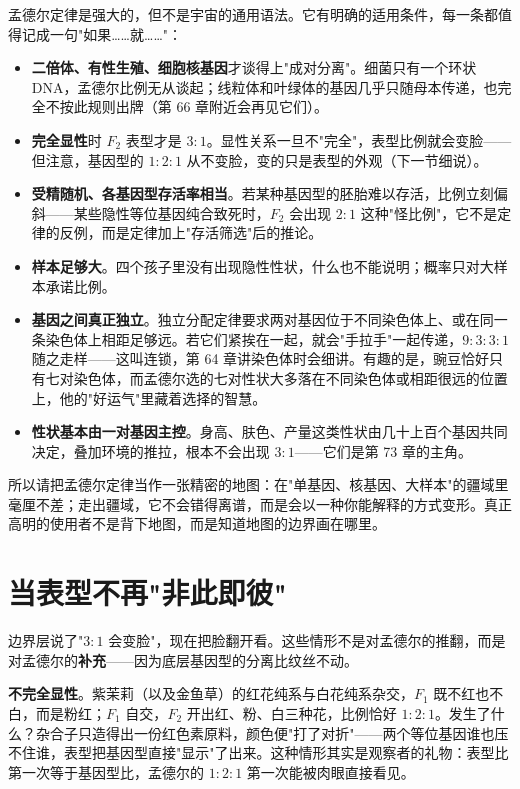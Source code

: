 孟德尔定律是强大的，但不是宇宙的通用语法。它有明确的适用条件，每一条都值得记成一句"如果……就……"：

\begin{itemize}[itemsep=2pt]
\item \textbf{二倍体、有性生殖、细胞核基因}才谈得上"成对分离"。细菌只有一个环状 DNA，孟德尔比例无从谈起；线粒体和叶绿体的基因几乎只随母本传递，也完全不按此规则出牌（第 66 章附近会再见它们）。
\item \textbf{完全显性}时 $F_2$ 表型才是 $3:1$。显性关系一旦不"完全"，表型比例就会变脸——但注意，基因型的 $1:2:1$ 从不变脸，变的只是表型的外观（下一节细说）。
\item \textbf{受精随机、各基因型存活率相当}。若某种基因型的胚胎难以存活，比例立刻偏斜——某些隐性等位基因纯合致死时，$F_2$ 会出现 $2:1$ 这种"怪比例"，它不是定律的反例，而是定律加上"存活筛选"后的推论。
\item \textbf{样本足够大}。四个孩子里没有出现隐性性状，什么也不能说明；概率只对大样本承诺比例。
\item \textbf{基因之间真正独立}。独立分配定律要求两对基因位于不同染色体上、或在同一条染色体上相距足够远。若它们紧挨在一起，就会"手拉手"一起传递，$9:3:3:1$ 随之走样——这叫连锁，第 64 章讲染色体时会细讲。有趣的是，豌豆恰好只有七对染色体，而孟德尔选的七对性状大多落在不同染色体或相距很远的位置上，他的"好运气"里藏着选择的智慧。
\item \textbf{性状基本由一对基因主控}。身高、肤色、产量这类性状由几十上百个基因共同决定，叠加环境的推拉，根本不会出现 $3:1$——它们是第 73 章的主角。
\end{itemize}

所以请把孟德尔定律当作一张精密的地图：在"单基因、核基因、大样本"的疆域里毫厘不差；走出疆域，它不会错得离谱，而是会以一种你能解释的方式变形。真正高明的使用者不是背下地图，而是知道地图的边界画在哪里。

\section{当表型不再"非此即彼"}

边界层说了"$3:1$ 会变脸"，现在把脸翻开看。这些情形不是对孟德尔的推翻，而是对孟德尔的\textbf{补充}——因为底层基因型的分离比纹丝不动。

\textbf{不完全显性}。紫茉莉（以及金鱼草）的红花纯系与白花纯系杂交，$F_1$ 既不红也不白，而是粉红；$F_1$ 自交，$F_2$ 开出红、粉、白三种花，比例恰好 $1:2:1$。发生了什么？杂合子只造得出一份红色素原料，颜色便"打了对折"——两个等位基因谁也压不住谁，表型把基因型直接"显示"了出来。这种情形其实是观察者的礼物：表型比第一次等于基因型比，孟德尔的 $1:2:1$ 第一次能被肉眼直接看见。


